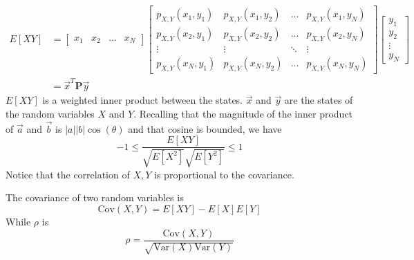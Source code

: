 \begin{align}
    E[XY] & = \begin{bmatrix}
                  x_1   &
                  x_2   &
                  \dots &
                  x_N
              \end{bmatrix}
    \begin{bmatrix}
        p_{X,Y}(x_1, y_1) & p_{X,Y}(x_1, y_2) & \dots  & p_{X,Y}(x_1, y_N) \\
        p_{X,Y}(x_2, y_1) & p_{X,Y}(x_2, y_2) & \dots  & p_{X,Y}(x_2, y_N) \\
        \vdots            & \vdots            & \ddots & \vdots            \\
        p_{X,Y}(x_N, y_1) & p_{X,Y}(x_N, y_2) & \dots  & p_{X,Y}(x_N, y_N)
    \end{bmatrix}
    \begin{bmatrix}
        y_1    \\
        y_2    \\
        \vdots \\
        y_N
    \end{bmatrix}                         \\
          & = \vec{x}^T \mathbf{P} \vec{y}
\end{align}
$E[XY]$ is a weighted inner product between the
states. $\vec{x}$ and $\vec{y}$ are the states of
the random variables $X$ and $Y$. Recalling that the
magnitude of the inner product of $\vec{a}$ and $\vec{b}$
is $|a||b|\cos(\theta)$ and that cosine is bounded, we have
\begin{equation}
    -1 \leq \frac{E[XY]}{\sqrt{E[X^2]}\sqrt{E[Y^2]}} \leq 1
\end{equation}
Notice that the correlation of $X,Y$ is
proportional to the covariance.

The covariance of two random variables is
\begin{equation}
    \text{Cov}(X, Y) = E[XY] - E[X]E[Y]
\end{equation}
While $\rho$ is
\begin{equation}
    \rho = \frac{\text{Cov}(X, Y)}{\sqrt{\text{Var}(X)\text{Var}(Y)}}
\end{equation}